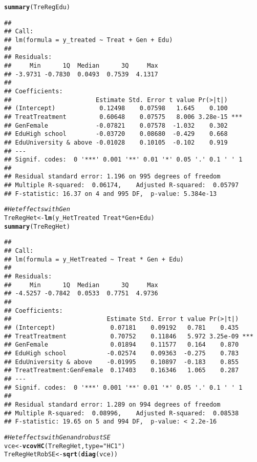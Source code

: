 \documentclass[11pt, a4paper]{article}\usepackage[]{graphicx}\usepackage[]{color}
\makeatletter
\newcommand{\hlstr}[1]{\textcolor[rgb]{0.192,0.494,0.8}{#1}}%
\newcommand{\hlcom}[1]{\textcolor[rgb]{0.678,0.584,0.686}{\textit{#1}}}%
\newcommand{\hlopt}[1]{\textcolor[rgb]{0,0,0}{#1}}%
\newcommand{\hlstd}[1]{\textcolor[rgb]{0.345,0.345,0.345}{#1}}%
\newcommand{\hlkwb}[1]{\textcolor[rgb]{0.69,0.353,0.396}{#1}}%
\newcommand{\hlkwc}[1]{\textcolor[rgb]{0.333,0.667,0.333}{#1}}%
\newcommand{\hlkwd}[1]{\textcolor[rgb]{0.737,0.353,0.396}{\textbf{#1}}}%
\newenvironment{kframe}{%
 \def\at@end@of@kframe{}%
 \ifinner\ifhmode%
  \def\at@end@of@kframe{\end{minipage}}%
  \begin{minipage}{\columnwidth}%
 \fi\fi%
 \def\FrameCommand##1{\hskip\@totalleftmargin \hskip-\fboxsep
 \colorbox{shadecolor}{##1}\hskip-\fboxsep
     \hskip-\linewidth \hskip-\@totalleftmargin \hskip\columnwidth}%
 \MakeFramed {\advance\hsize-\width
   \@totalleftmargin\z@ \linewidth\hsize
   \@setminipage}}%
 {\par\unskip\endMakeFramed%
 \at@end@of@kframe}
\newenvironment{knitrout}{}{} %
\makeatother
\begin{document}
\begin{knitrout}
\begin{kframe}
\begin{alltt}
  \hlkwd{summary}\hlstd{(TreRegEdu)}
\end{alltt}
\begin{verbatim}
## 
## Call:
## lm(formula = y_treated ~ Treat + Gen + Edu)
## 
## Residuals:
##     Min      1Q  Median      3Q     Max 
## -3.9731 -0.7830  0.0493  0.7539  4.1317 
## 
## Coefficients:
##                       Estimate Std. Error t value Pr(>|t|)    
## (Intercept)            0.12498    0.07598   1.645    0.100    
## TreatTreatment         0.60648    0.07575   8.006 3.28e-15 ***
## GenFemale             -0.07821    0.07578  -1.032    0.302    
## EduHigh school        -0.03720    0.08680  -0.429    0.668    
## EduUniversity & above -0.01028    0.10105  -0.102    0.919    
## ---
## Signif. codes:  0 '***' 0.001 '**' 0.01 '*' 0.05 '.' 0.1 ' ' 1
## 
## Residual standard error: 1.196 on 995 degrees of freedom
## Multiple R-squared:  0.06174,	Adjusted R-squared:  0.05797 
## F-statistic: 16.37 on 4 and 995 DF,  p-value: 5.384e-13
\end{verbatim}
\begin{alltt}
  \hlcom{#Het effects with Gen}
  \hlstd{TreRegHet} \hlkwb{<-} \hlkwd{lm}\hlstd{(y_HetTreated} \hlopt{~} \hlstd{Treat}\hlopt{*}\hlstd{Gen} \hlopt{+} \hlstd{Edu)}
  \hlkwd{summary}\hlstd{(TreRegHet)}
\end{alltt}
\begin{verbatim}
## 
## Call:
## lm(formula = y_HetTreated ~ Treat * Gen + Edu)
## 
## Residuals:
##     Min      1Q  Median      3Q     Max 
## -4.5257 -0.7842  0.0533  0.7751  4.9736 
## 
## Coefficients:
##                          Estimate Std. Error t value Pr(>|t|)    
## (Intercept)               0.07181    0.09192   0.781    0.435    
## TreatTreatment            0.70752    0.11846   5.972 3.25e-09 ***
## GenFemale                 0.01894    0.11577   0.164    0.870    
## EduHigh school           -0.02574    0.09363  -0.275    0.783    
## EduUniversity & above    -0.01995    0.10897  -0.183    0.855    
## TreatTreatment:GenFemale  0.17403    0.16346   1.065    0.287    
## ---
## Signif. codes:  0 '***' 0.001 '**' 0.01 '*' 0.05 '.' 0.1 ' ' 1
## 
## Residual standard error: 1.289 on 994 degrees of freedom
## Multiple R-squared:  0.08996,	Adjusted R-squared:  0.08538 
## F-statistic: 19.65 on 5 and 994 DF,  p-value: < 2.2e-16
\end{verbatim}
\begin{alltt}
  \hlcom{#Het effects with Gen and robust SE}
  \hlstd{vce} \hlkwb{<-} \hlkwd{vcovHC}\hlstd{(TreRegHet,} \hlkwc{type} \hlstd{=} \hlstr{"HC1"}\hlstd{)}
  \hlstd{TreRegHetRobSE} \hlkwb{<-} \hlkwd{sqrt}\hlstd{(}\hlkwd{diag}\hlstd{(vce))}

\end{alltt}
\end{kframe}
\end{knitrout}
\end{document}
